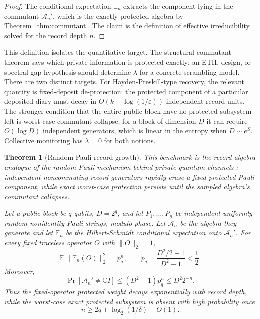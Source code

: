 \documentclass[11pt]{article}
\newtheorem{theorem}{Theorem}
\newcommand{\cA}{\mathcal A}
\begin{document}
\begin{proof}
The conditional expectation $\mathbb E_n$ extracts the component lying
in the commutant $\cA_n'$, which is the exactly protected algebra by
Theorem~\ref{thm:commutant}.  The claim is the definition of effective
irreducibility solved for the record depth $n$.
\end{proof}

This definition isolates the quantitative target.  The structural
commutant theorem says which private information is protected exactly;
an ETH, design, or spectral-gap hypothesis should determine $\lambda$
for a concrete scrambling model.  There are two distinct targets.  For
Hayden-Preskill-type recovery, the relevant quantity is fixed-deposit
de-protection: the protected component of a particular deposited diary
must decay in $O(k+\log(1/\varepsilon))$ independent record units.  The
stronger condition that the entire public block have no protected
subsystem left is worst-case commutant collapse; for a block of
dimension $D$ it can require $O(\log D)$ independent generators, which is
linear in the entropy when $D\sim e^S$.  Collective monitoring has
$\lambda=0$ for both notions.

\begin{theorem}[Random Pauli record growth]
\label{thm:pauli-growth}
This benchmark is the record-algebra analogue of the random Pauli
mechanism behind private quantum channels
\citep{AmbainisMoscaTappDeWolf2000}: independent noncommuting record
generators rapidly erase a fixed protected Pauli component, while exact
worst-case protection persists until the sampled algebra's commutant
collapses.

Let a public block be $q$ qubits, $D=2^q$, and let
$P_1,\ldots,P_n$ be independent uniformly random nonidentity Pauli
strings, modulo phase.  Let $\cA_n$ be the algebra they generate and
let $\mathbb E_n$ be the Hilbert-Schmidt conditional expectation onto
$\cA_n'$.  For every fixed traceless operator $O$ with
$\lVert O\rVert_2=1$,
\begin{equation}
  \mathbb E\,
  \lVert \mathbb E_n(O)\rVert_2^2
  =
  p_q^n,
  \qquad
  p_q =
  \frac{D^2/2-1}{D^2-1}
  < \frac12 .
\end{equation}
Moreover,
\begin{equation}
  \Pr[\cA_n'\ne \mathbb C I]
  \le
  (D^2-1)p_q^n
  \le
  D^2 2^{-n}.
\end{equation}
Thus the fixed-operator protected weight decays exponentially with
record depth, while the worst-case exact protected subsystem is absent
with high probability once
\begin{equation}
  n \ge 2q+\log_2(1/\delta)+O(1).
\end{equation}
\end{theorem}
\end{document}
